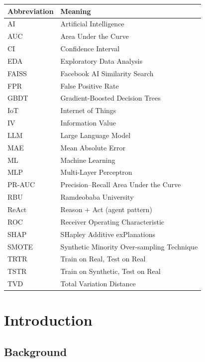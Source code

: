 \documentclass[12pt,a4paper]{article}
\begin{document}
\begin{longtable}{@{}ll@{}}
\toprule
\textbf{Abbreviation} & \textbf{Meaning} \\
\midrule
\endhead
AI     & Artificial Intelligence \\
AUC    & Area Under the Curve \\
CI     & Confidence Interval \\
EDA    & Exploratory Data Analysis \\
FAISS  & Facebook AI Similarity Search \\
FPR    & False Positive Rate \\
GBDT   & Gradient-Boosted Decision Trees \\
IoT    & Internet of Things \\
IV     & Information Value \\
LLM    & Large Language Model \\
MAE    & Mean Absolute Error \\
ML     & Machine Learning \\
MLP    & Multi-Layer Perceptron \\
PR-AUC & Precision--Recall Area Under the Curve \\
RBU    & Ramdeobaba University \\
ReAct  & Reason + Act (agent pattern) \\
ROC    & Receiver Operating Characteristic \\
SHAP   & SHapley Additive exPlanations \\
SMOTE  & Synthetic Minority Over-sampling Technique \\
TRTR   & Train on Real, Test on Real \\
TSTR   & Train on Synthetic, Test on Real \\
TVD    & Total Variation Distance \\
\bottomrule
\end{longtable}

\newpage
\section{Introduction}
\label{ch:intro}

\subsection{Background}
\end{document}

